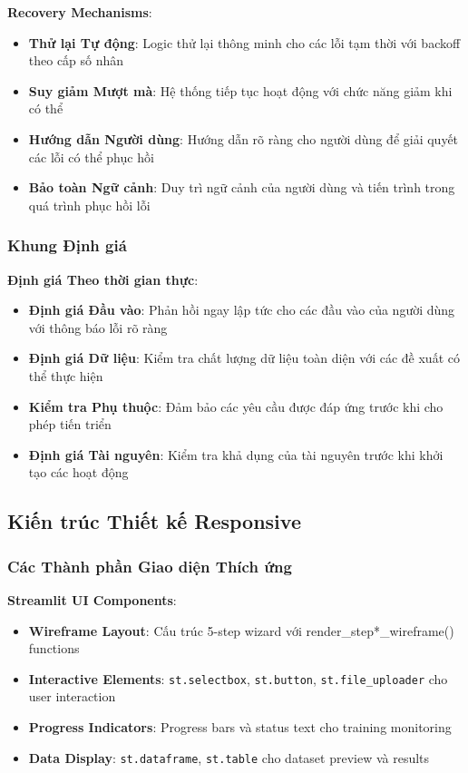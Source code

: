 \textbf{Recovery Mechanisms}:
\begin{itemize}
    \item \textbf{Thử lại Tự động}: Logic thử lại thông minh cho các lỗi tạm thời với backoff theo cấp số nhân
    \item \textbf{Suy giảm Mượt mà}: Hệ thống tiếp tục hoạt động với chức năng giảm khi có thể
    \item \textbf{Hướng dẫn Người dùng}: Hướng dẫn rõ ràng cho người dùng để giải quyết các lỗi có thể phục hồi
    \item \textbf{Bảo toàn Ngữ cảnh}: Duy trì ngữ cảnh của người dùng và tiến trình trong quá trình phục hồi lỗi
\end{itemize}

\subsubsection{Khung Định giá}

\textbf{Định giá Theo thời gian thực}:
\begin{itemize}
    \item \textbf{Định giá Đầu vào}: Phản hồi ngay lập tức cho các đầu vào của người dùng với thông báo lỗi rõ ràng
    \item \textbf{Định giá Dữ liệu}: Kiểm tra chất lượng dữ liệu toàn diện với các đề xuất có thể thực hiện
    \item \textbf{Kiểm tra Phụ thuộc}: Đảm bảo các yêu cầu được đáp ứng trước khi cho phép tiến triển
    \item \textbf{Định giá Tài nguyên}: Kiểm tra khả dụng của tài nguyên trước khi khởi tạo các hoạt động
\end{itemize}

\subsection{Kiến trúc Thiết kế Responsive}\label{subsec:responsive-design}

\subsubsection{Các Thành phần Giao diện Thích ứng}

\textbf{Streamlit UI Components}:
\begin{itemize}
    \item \textbf{Wireframe Layout}: Cấu trúc 5-step wizard với render\_step*\_wireframe() functions
    \item \textbf{Interactive Elements}: \texttt{st.selectbox}, \texttt{st.button}, \texttt{st.file\_uploader} cho user interaction
    \item \textbf{Progress Indicators}: Progress bars và status text cho training monitoring
    \item \textbf{Data Display}: \texttt{st.dataframe}, \texttt{st.table} cho dataset preview và results
\end{itemize}

